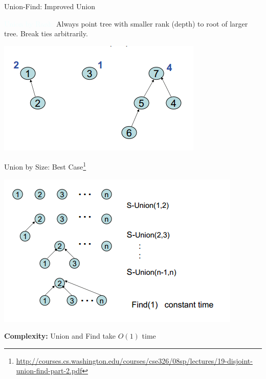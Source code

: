 \documentclass{beamer}
\newcommand{\tblue}[1]{{\Large {\textcolor{azure}{#1}}}}
\begin{document}
\begin{frame}{Union-Find: Improved Union}

\tblue{Union by Rank:} Always point tree with smaller rank (depth) to root of larger tree. Break ties arbitrarily.
    \begin{center}
        \includegraphics[scale=0.5]{unionByRank.png} 
    \end{center}
\end{frame}

\begin{frame}{Union by Size: Best Case\footnote{\url{http://courses.cs.washington.edu/courses/cse326/08sp/lectures/19-disjoint-union-find-part-2.pdf}}}

    \begin{center}
        \includegraphics[scale=0.5]{unionByRankBestCase.png} 
    \end{center}

    {\bf Complexity:} \pause Union and Find take $O(1)$ time
\end{frame}
\end{document}

